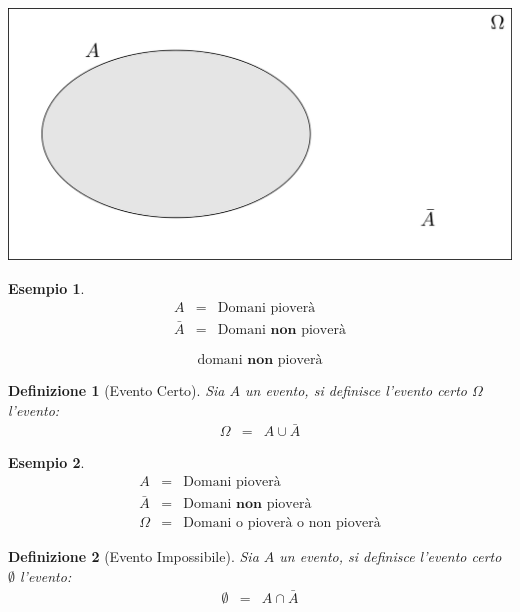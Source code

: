\documentclass[
  11pt,
]{book}
\theoremstyle{mytheoremstyle}
\theoremstyle{mydefstyle}
\newtheorem{definition}{Definizione}[section]
\newtheorem{example}{{Esempio}}[section]
\begin{document}
\begin{center}\includegraphics[width=41.67in,height=0.2\textheight,]{img/complementare} \end{center}

\begin{example}
\begin{eqnarray*}
    A&=&  \text{Domani pioverà}\\
    \bar A&=&  \text{Domani }\textbf{non}\text{ pioverà}
\end{eqnarray*}
\end{example}

\[
\text{domani}\textbf{ non}\text{ pioverà}
\]

\begin{info}

\begin{definition}[Evento Certo]
Sia \(A\) un evento, si definisce l'evento certo \(\Omega\) l'evento:
\begin{eqnarray*}
\Omega &=& A\cup\bar A
\end{eqnarray*}
\end{definition}

\end{info}

\begin{example}
\begin{eqnarray*}
    A&=&  \text{Domani pioverà}\\
    \bar A&=&  \text{Domani }\textbf{non}\text{ pioverà}\\
    \Omega &=& \text{Domani o pioverà o non pioverà}
\end{eqnarray*}
\end{example}

\begin{info}

\begin{definition}[Evento Impossibile]
Sia \(A\) un evento, si definisce l'evento certo \(\emptyset\) l'evento:
\begin{eqnarray*}
\emptyset &=& A\cap\bar A
\end{eqnarray*}
\end{definition}

\end{info}
\end{document}
